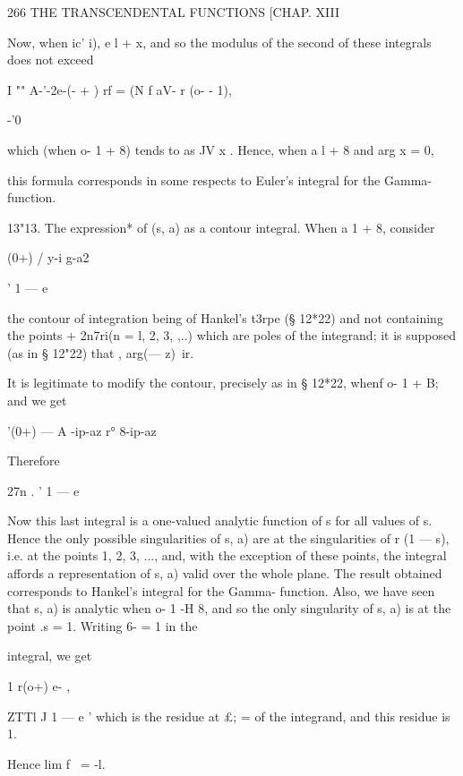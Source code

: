 266 THE TRANSCENDENTAL FUNCTIONS [CHAP. XIII 

Now, when ic' i), e l + x, and so the modulus of the second of these 
integrals does not exceed 

I "" A-'-2e-(- + ) rf  = (N f aV- r (o- - 1), 

-'0 

which (when o-   1 + 8) tends to as JV   x . 
Hence, when a l + 8 and arg x = 0, 



this formula corresponds in some respects to Euler's integral for the Gamma- 
function. 

13"13. The expression* of (s, a) as a contour integral. 
When a  1 + 8, consider 

(0+) /  y-i g-a2 



' 1 — e   



the contour of integration being of Hankel's t3rpe (§ 12*22) and not containing 
the points + 2n7ri(n = l, 2, 3, ,..) which are poles of the integrand; it is 
supposed (as in § 12"22) that , arg(— z)\   ir. 

It is legitimate to modify the contour, precisely as in § 12*22, whenf 
o-   1 + B; and we get 



'(0+)  — A -ip-az r° 8-ip-az 



Therefore 



27n . ' 1 — e   



Now this last integral is a one-valued analytic function of s for all values 
of s. Hence the only possible singularities of   s, a) are at the singularities 
of r (1 — s), i.e. at the points 1, 2, 3, ..., and, with the exception of these 
points, the integral affords a representation of   s, a) valid over the whole 
plane. The result obtained corresponds to Hankel's integral for the Gamma- 
function. Also, we have seen that   s, a) is analytic when o-   1 -H 8, and 
so the only singularity of   s, a) is at the point .s = 1. Writing 6- = 1 in the 

integral, we get 

1 r(o+) e-   , 

ZTTl J   1 — e '  
which is the residue at £; = of the integrand, and this residue is 1. 

Hence lim  f \ = -l. 

